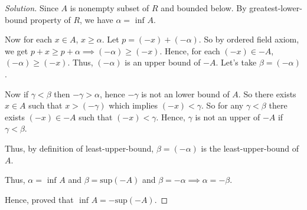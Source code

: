 \begin{proof}[Solution]
	Since $A$ is nonempty subset of $R$ and bounded below.
	By greatest-lower-bound property of $R$, we have $\alpha = \text{ inf } A$.

	Now for each $x \in A$, $x \geq \alpha$. Let $p = (-x) + (-\alpha)$.
	So by ordered field axiom, we get $p + x \geq p + \alpha \implies (-\alpha) \geq (-x)$.
	Hence, for each $(-x) \in -A$, $(-\alpha) \geq (-x)$. Thus, $(-\alpha)$ is an upper bound of $-A$.
	Let's take $\beta = (-\alpha)$.

	Now if $\gamma < \beta$ then $-\gamma > \alpha$, hence $-\gamma$ is not an lower bound of $A$.
	So there exists $x \in A$ such that $x > (-\gamma)$ which implies $(-x) < \gamma$.
	So for any $\gamma < \beta$ there exists $(-x) \in -A$ such that $(-x) < \gamma$.
	Hence, $\gamma$ is not an upper of $-A$ if $\gamma < \beta$.

	Thus, by definition of least-upper-bound, $\beta = (-\alpha)$ is the least-upper-bound of $A$.

	Thus, $\alpha = \text{ inf }A$ and $\beta = \text{sup}(-A)$ and $\beta = - \alpha \implies \alpha = - \beta$.

	Hence, proved that $\text{ inf } A = - \text{sup}(-A)$.

\end{proof}

